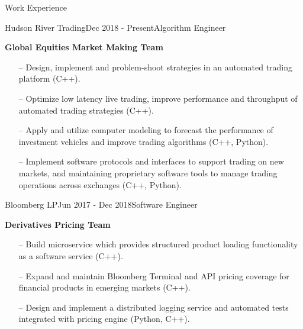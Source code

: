 \documentclass{resume} %
\begin{document}

\begin{rSection}{Work Experience}

\begin{rSubsection}{Hudson River Trading}{Dec 2018 - Present}{Algorithm Engineer}{}
\item \textbf{Global Equities Market Making Team}

\begin{itemize}[noitemsep,topsep=-6pt,leftmargin=1em]
\item[--] Design, implement and problem-shoot strategies in an automated trading platform (C++).
\item[--] Optimize low latency live trading, improve performance and throughput of automated trading strategies (C++).
\item[--] Apply and utilize computer modeling to forecast the performance of investment vehicles and improve trading algorithms (C++, Python).
\item[--] Implement software protocols and interfaces to support trading on new markets, and maintaining proprietary software tools to manage trading operations across exchanges (C++, Python).
\end{itemize}

\end{rSubsection}

\begin{rSubsection}{Bloomberg LP}{Jun 2017 - Dec 2018}{Software Engineer}{}
\item \textbf{Derivatives Pricing Team}

\begin{itemize}[noitemsep,topsep=-6pt,leftmargin=1em]
\item[--] Build microservice which provides structured product loading functionality as a software service (C++).
\item[--] Expand and maintain Bloomberg Terminal and API pricing coverage for financial products in emerging markets (C++).
\item[--] Design and implement a distributed logging service and automated tests integrated with pricing engine (Python, C++).
\end{itemize}

\end{rSubsection}


\end{rSection}
\end{document}
